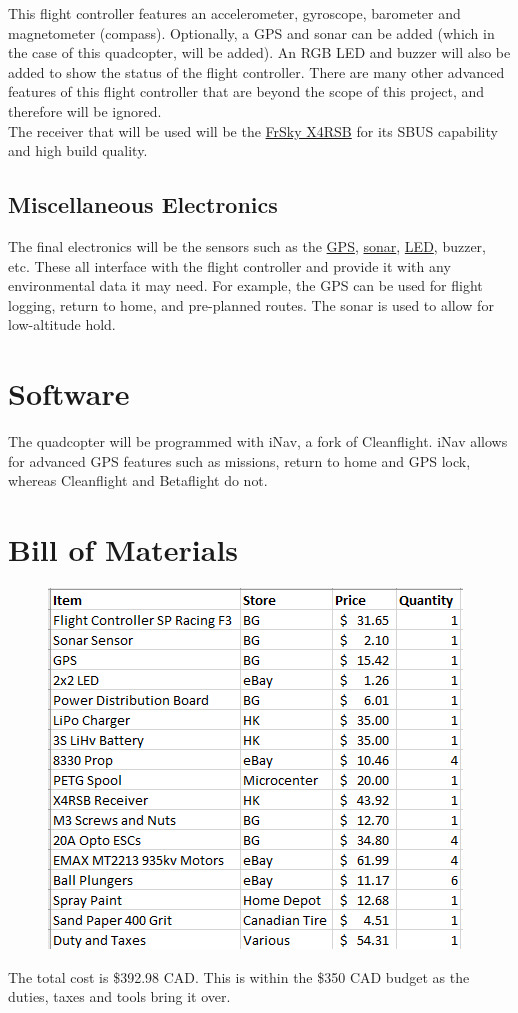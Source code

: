 \documentclass[12pt]{article}
\begin{document}
This flight controller features an accelerometer, gyroscope, barometer and magnetometer (compass). Optionally, a GPS and sonar can be added (which in the case of this quadcopter, will be added). An RGB LED and buzzer will also be added to show the status of the flight controller. There are many other advanced features of this flight controller that are beyond the scope of this project, and therefore will be ignored.
\\

The receiver that will be used will be the \href{https://hobbyking.com/en_us/frsky-x4rsb-3-16ch-2-4ghz-accst-receiver-w-telemetry.html}{\color{cyan}FrSky X4RSB} for its SBUS capability and high build quality. 

\subsection{Miscellaneous Electronics}
The final electronics will be the sensors such as the \href{https://www.banggood.com/NZ-GPS-For-NAZE32-Flip32-6dof-10dof-Best-For-QAV250-ZMR250-Multicopter-Quadcopter-p-1015134.html}{\color{cyan}GPS}, \href{https://www.banggood.com/Wholesale-Ultrasonic-Module-HC-SR04-Distance-Measuring-Ranging-Transducer-Sensor-p-40313.html?rmmds=myorder}{\color{cyan}sonar}, \href{https://www.ebay.ca/itm/WS2812B-2-2-4-Bit-Full-Color-5050-RGB-LED-Lamp-Panel-Light-For-Arduino/311691754997?ssPageName=STRK%3AMEBIDX%3AIT&_trksid=p2057872.m2749.l2649}{\color{cyan}LED}, buzzer, etc. These all interface with the flight controller and provide it with any environmental data it may need. For example, the GPS can be used for flight logging, return to home, and pre-planned routes. The sonar is used to allow for low-altitude hold. 

\section{Software}
The quadcopter will be programmed with iNav, a fork of Cleanflight. iNav allows for advanced GPS features such as missions, return to home and GPS lock, whereas Cleanflight and Betaflight do not. 

\section{Bill of Materials}
\begin{figure}[h]
\centering
\includegraphics{bom.png}
\end{figure}

The total cost is \$392.98 CAD. This is within the \$350 CAD budget as the duties, taxes and tools bring it over.
\end{document}
